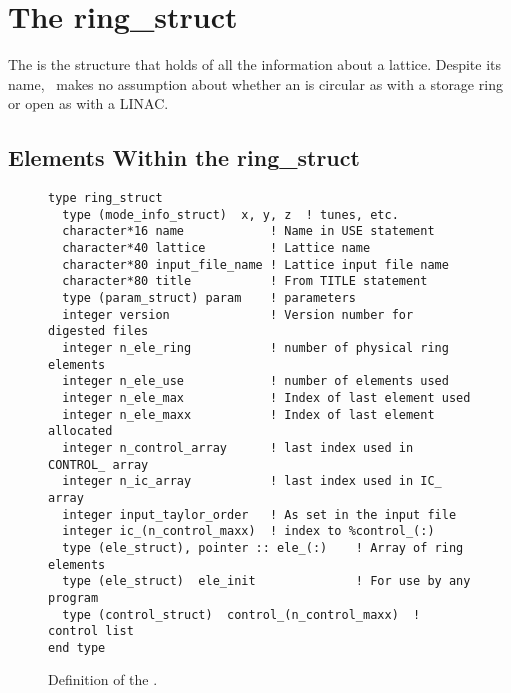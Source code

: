 \chapter{The ring\_struct}
\label{c:ring_struct}

The  is the structure that holds of all the information 
about a lattice.   Despite its name, \bmad\
makes no assumption about whether an  is circular as
with a storage ring or open as with a LINAC.

\section{Elements Within the ring\_struct}

\begin{figure}[htb]
\centering
\begin{verbatim}
type ring_struct
  type (mode_info_struct)  x, y, z  ! tunes, etc.
  character*16 name            ! Name in USE statement
  character*40 lattice         ! Lattice name
  character*80 input_file_name ! Lattice input file name
  character*80 title           ! From TITLE statement
  type (param_struct) param    ! parameters
  integer version              ! Version number for digested files
  integer n_ele_ring           ! number of physical ring elements
  integer n_ele_use            ! number of elements used
  integer n_ele_max            ! Index of last element used
  integer n_ele_maxx           ! Index of last element allocated
  integer n_control_array      ! last index used in CONTROL_ array
  integer n_ic_array           ! last index used in IC_ array
  integer input_taylor_order   ! As set in the input file
  integer ic_(n_control_maxx)  ! index to %control_(:)
  type (ele_struct), pointer :: ele_(:)    ! Array of ring elements
  type (ele_struct)  ele_init              ! For use by any program
  type (control_struct)  control_(n_control_maxx)  ! control list
end type
\end{verbatim}
\caption{Definition of the .}
\label{f:ring_struct}
\end{figure}

